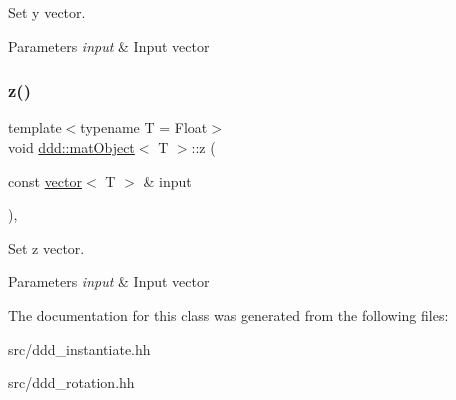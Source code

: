 Set y vector. 


\begin{DoxyParams}{Parameters}
{\em input} & Input vector \\
\hline
\end{DoxyParams}
\mbox{\label{classddd_1_1mat_object_ae234d843cfd0a90b5e67b946ec18bfea}} 
\subsubsection{\texorpdfstring{z()}{z()}}
{\footnotesize\ttfamily template$<$typename T  = Float$>$ \\
void \hyperlink{classddd_1_1mat_object}{ddd\+::mat\+Object}$<$ T $>$\+::z (\begin{DoxyParamCaption}\item[{const \hyperlink{classddd_1_1vector}{vector}$<$ T $>$ \&}]{input }\end{DoxyParamCaption})\hspace{0.3cm}{\ttfamily [inline]}, {\ttfamily [inherited]}}



Set z vector. 


\begin{DoxyParams}{Parameters}
{\em input} & Input vector \\
\hline
\end{DoxyParams}


The documentation for this class was generated from the following files\+:\begin{DoxyCompactItemize}
\item 
src/ddd\+\_\+instantiate.\+hh\item 
src/ddd\+\_\+rotation.\+hh\end{DoxyCompactItemize}
